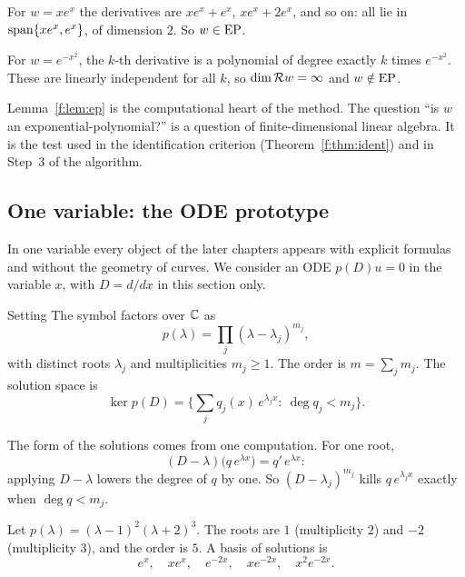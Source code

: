 \begin{example}
For $w=xe^{x}$ the derivatives are $xe^x+e^x$, $xe^x+2e^x$, and so on: all lie in $\operatorname{span}\{xe^x,e^x\}$, of dimension $2$. So $w\in\mathrm{EP}$.

For $w=e^{-x^2}$, the $k$-th derivative is a polynomial of degree exactly $k$ times $e^{-x^2}$. These are linearly independent for all $k$, so $\operatorname{dim}\mathcal{R} w=\infty$ and $w\notin\mathrm{EP}$.
\end{example}

\begin{takeaway}
Lemma~\ref{f:lem:ep} is the computational heart of the method. The question ``is $w$ an exponential-polynomial?'' is a question of finite-dimensional linear algebra. It is the test used in the identification criterion (Theorem~\ref{f:thm:ident}) and in Step~3 of the algorithm.
\end{takeaway}

\subsection{One variable: the ODE prototype}\label{sec:ode}

In one variable every object of the later chapters appears with explicit formulas and without the geometry of curves. We consider an ODE $p(D)u=0$ in the variable $x$, with $D=d/dx$ in this section only.

\begin{notebox}{Setting}
The symbol factors over $\mathbb{C}$ as
\[
p(\lambda)=\prod_j(\lambda-\lambda_j)^{m_j},
\]
with distinct roots $\lambda_j$ and multiplicities $m_j\ge1$. The order is $m=\sum_jm_j$. The solution space is
\[
\ker p(D)=\Big\{\sum_jq_j(x)\,e^{\lambda_jx}:\ \deg q_j<m_j\Big\}.
\]
\end{notebox}

The form of the solutions comes from one computation. For one root,
\[
(D-\lambda)\big(q\,e^{\lambda x}\big)=q'\,e^{\lambda x}:
\]
applying $D-\lambda$ lowers the degree of $q$ by one. So $(D-\lambda_j)^{m_j}$ kills $q\,e^{\lambda_jx}$ exactly when $\deg q<m_j$.

\begin{example}
Let $p(\lambda)=(\lambda-1)^2(\lambda+2)^3$. The roots are $1$ (multiplicity $2$) and $-2$ (multiplicity $3$), and the order is $5$. A basis of solutions is
\[
e^{x},\quad xe^{x},\quad e^{-2x},\quad xe^{-2x},\quad x^2e^{-2x}.
\]
\end{example}


